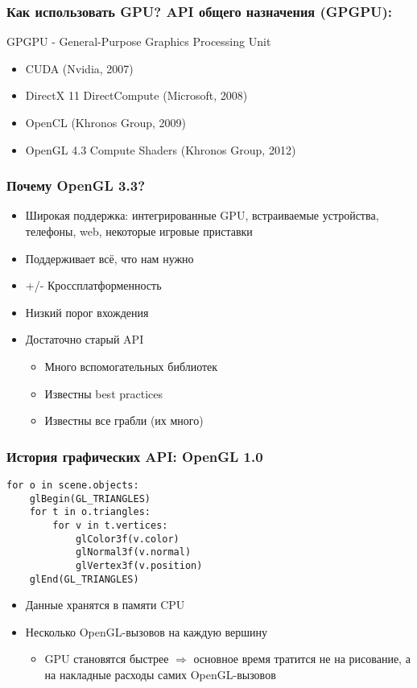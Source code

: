 \documentclass{beamer}
\begin{document}
\begin{frame}
\frametitle{Как использовать GPU? API общего назначения (GPGPU):}
GPGPU - General-Purpose Graphics Processing Unit
\pause
\begin{itemize}
\item CUDA (Nvidia, 2007)
\pause
\item DirectX 11 DirectCompute (Microsoft, 2008)
\pause
\item OpenCL (Khronos Group, 2009)
\pause
\item OpenGL 4.3 Compute Shaders (Khronos Group, 2012)
\end{itemize}
\end{frame}

\begin{frame}
\frametitle{Почему OpenGL 3.3?}
\pause
\begin{itemize}
\item Широкая поддержка: интегрированные GPU, встраиваемые устройства, телефоны, web, некоторые игровые приставки
\pause
\item Поддерживает всё, что нам нужно
\pause
\item +/- Кроссплатформенность
\pause
\item Низкий порог вхождения
\pause
\item Достаточно старый API
\begin{itemize}
\item Много вспомогательных библиотек
\item Известны best practices
\item Известны все грабли \pause (их много)
\end{itemize}
\end{itemize}
\end{frame}

\begin{frame}[fragile]
\frametitle{История графических API: OpenGL 1.0}
\begin{verbatim}
for o in scene.objects:
    glBegin(GL_TRIANGLES)
    for t in o.triangles:
        for v in t.vertices:
            glColor3f(v.color)
            glNormal3f(v.normal)
            glVertex3f(v.position)
    glEnd(GL_TRIANGLES)
\end{verbatim}
\pause
\begin{itemize}
\item Данные хранятся в памяти CPU
\pause
\item Несколько OpenGL-вызовов на каждую вершину
\pause
\begin{itemize}
\item GPU становятся быстрее $\Longrightarrow$ основное время тратится не на рисование, а на накладные расходы самих OpenGL-вызовов
\end{itemize}
\end{itemize}
\end{frame}
\end{document}
